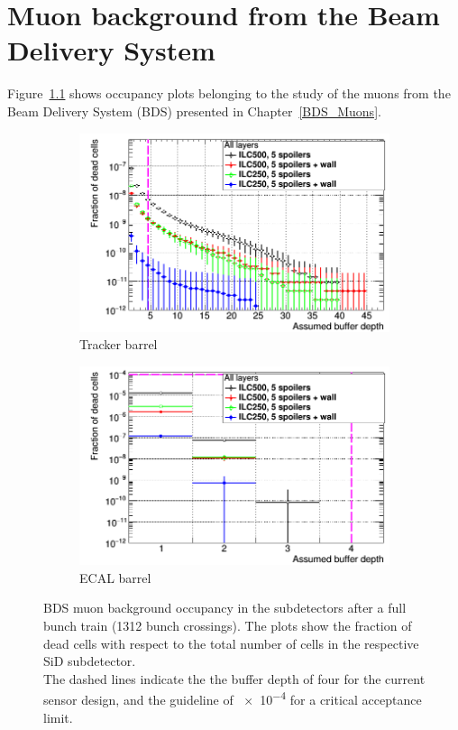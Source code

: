 \chapter{Muon background from the Beam Delivery System}
\label{Appendix:BDS_Muons}
Figure~\ref{fig:BDS_Muons:occupancies} shows occupancy plots belonging to the study of the muons from the Beam Delivery System (BDS) presented in Chapter~\ref{BDS_Muons}.
  \begin{figure}[htbp]
 \centering
  \begin{subfigure}[b]{0.49\textwidth}
   \centering
    \includegraphics[width=\textwidth]{Figures/BDS_muons/Occupancy_Comparison_All_layers_deadcells_SiTrackerBarrel.png}
   \caption{\sid Tracker barrel}
   \end{subfigure}
   \hfill
    \begin{subfigure}[b]{0.49\textwidth}
   \centering
    \includegraphics[width=\textwidth]{Figures/BDS_muons/Occupancy_Comparison_All_layers_deadcells_EcalBarrel.png}
   \caption{\sid ECAL barrel}
   \end{subfigure}
         \caption[Occupancy from BDS muons of various SiD subdetectors]{
   BDS muon background occupancy in the \sid subdetectors after a full bunch train (1312 bunch crossings).   
   The plots show the fraction of dead cells with respect to the total number of cells in the respective SiD subdetector.
   \\The dashed lines indicate the the buffer depth of four for the current sensor design, and the guideline of \num{e-4} for a critical acceptance limit.}
   \label{fig:BDS_Muons:occupancies}
     \end{figure}
